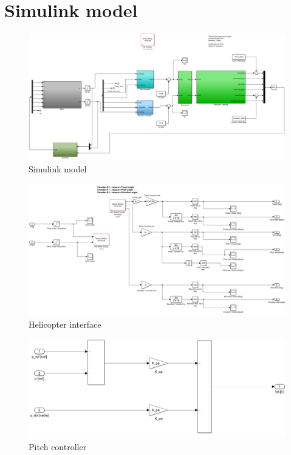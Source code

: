 \chapter{Simulink model}%

\begin{figure}
    \centering
    \includegraphics[angle=90,origin=c, scale=0.4]{fig/simulink/system.png}
    \caption{Simulink model}
    \label{fig:simulink_system}
\end{figure}

\begin{figure}
    \centering
    \includegraphics[scale=0.20]{fig/simulink/heli_interface.png}
    \caption{Helicopter interface}
    \label{fig:simulink_heli_interface}
\end{figure}

\begin{figure}
    \centering
    \includegraphics[scale=0.2]{fig/simulink/pitch_controller.png}
    \caption{Pitch controller}
    \label{fig:simulink_pitch_contr}
\end{figure}

